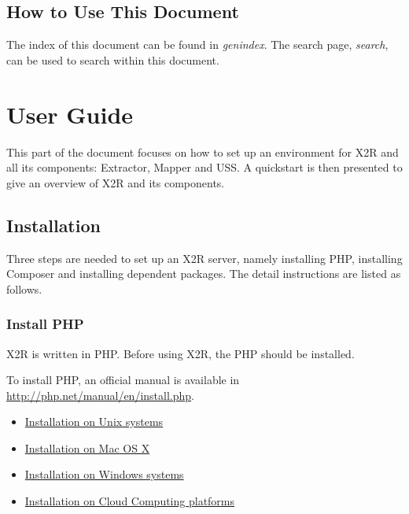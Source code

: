 \documentclass[letterpaper,10pt,english]{sphinxmanual}
\begin{document}
\section{How to Use This Document}
\label{docs/howto:how-to-use-this-document}\label{docs/howto::doc}
The index of this document can be found in \emph{genindex}. The search page, \emph{search}, can be used to search within this document.


\chapter{User Guide}
\label{index:user-guide}
This part of the document focuses on how to set up an environment for X2R and all its components: Extractor, Mapper and USS. A quickstart is then presented to give an overview of X2R and its components.


\section{Installation}
\label{docs/install:installation}\label{docs/install::doc}\label{docs/install:id1}
Three steps are needed to set up an X2R server, namely installing PHP, installing Composer and installing dependent packages. The detail instructions are listed as follows.


\subsection{Install PHP}
\label{docs/install:install-php}
X2R is written in PHP. Before using X2R, the PHP should be installed.

To install PHP, an official manual is available in \href{http://php.net/manual/en/install.php}{http://php.net/manual/en/install.php}.
\begin{itemize}
\item {} 
\href{http://php.net/manual/en/install.unix.php}{Installation on Unix systems}

\item {} 
\href{http://php.net/manual/en/install.macosx.php}{Installation on Mac OS X}

\item {} 
\href{http://php.net/manual/en/install.windows.php}{Installation on Windows systems}

\item {} 
\href{http://php.net/manual/en/install.cloud.php}{Installation on Cloud Computing platforms}

\end{itemize}
\end{document}
